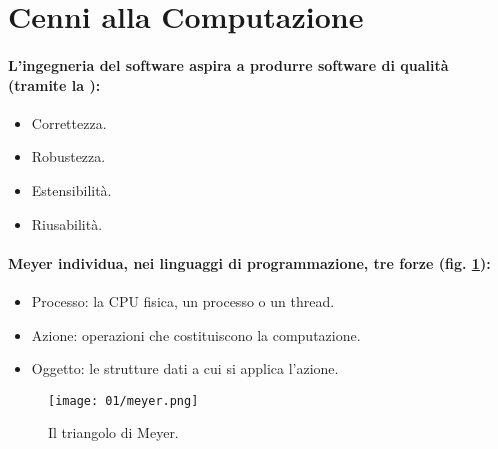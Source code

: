 


\section{Cenni alla Computazione}

\paragraph{L'ingegneria del software aspira a produrre software di qualità (tramite la ):}

\begin{itemize}
  \item Correttezza. 
  \item Robustezza. 
  \item Estensibilità. 
  \item Riusabilità.
\end{itemize}


\paragraph{Meyer individua, nei linguaggi di programmazione, tre forze (fig. \ref{fig:meyer}):}

\begin{itemize}
  \item Processo: la CPU fisica, un processo o un thread. 
  \item Azione: operazioni che costituiscono la computazione. 
  \item Oggetto: le strutture dati a cui si applica l'azione.
\end{itemize}

\begin{figure}[h]
  \centering
  \texttt{[image: 01/meyer.png]}
  \caption{Il triangolo di Meyer.}
  \label{fig:meyer}
\end{figure}


